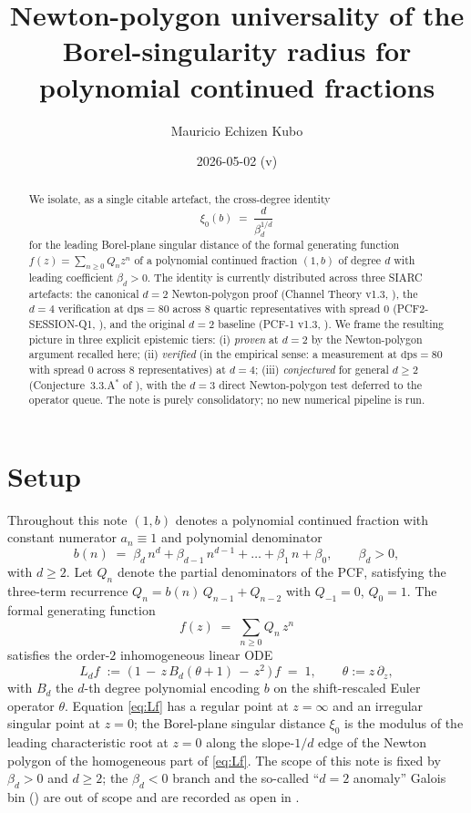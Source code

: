 \documentclass[11pt,reqno]{amsart}
\title[Newton-polygon universality of the Borel-singularity radius]
      {Newton-polygon universality of the Borel-singularity radius
       for polynomial continued fractions}
\author{Mauricio Echizen Kubo}
\date{2026-05-02 (v\version)}
\theoremstyle{plain}
\theoremstyle{definition}
\theoremstyle{remark}
\newcommand{\dps}{\mathrm{dps}}
\begin{document}
\begin{abstract}
We isolate, as a single citable artefact, the cross-degree
identity
\[
  \xi_0(b) \;=\; \frac{d}{\beta_d^{1/d}}
\]
for the leading Borel-plane singular distance of the formal
generating function $f(z) = \sum_{n\ge 0} Q_n z^n$ of a
polynomial continued fraction $(1, b)$ of degree $d$ with
leading coefficient $\beta_d > 0$. The identity is currently
distributed across three SIARC artefacts: the canonical
$d = 2$ Newton-polygon proof (Channel Theory v1.3,
\cite{siarc_channel_theory_v13}), the $d = 4$
verification at $\dps = 80$ across $8$ quartic
representatives with spread $0$
(PCF2-SESSION-Q1, \cite{siarc_pcf2_session_q1}),
and the original $d = 2$ baseline (PCF-1 v1.3,
\cite{siarc_pcf1_v13}). We frame the resulting picture
in three explicit epistemic tiers:
(i) \emph{proven} at $d = 2$ by the Newton-polygon argument
recalled here;
(ii) \emph{verified} (in the empirical sense: a measurement
at $\dps = 80$ with spread $0$ across $8$ representatives) at
$d = 4$;
(iii) \emph{conjectured} for general $d \ge 2$
(Conjecture~3.3.A$^{*}$ of \cite{siarc_channel_theory_v13}),
with the $d = 3$ direct Newton-polygon test deferred to the
operator queue. The note is purely consolidatory; no new
numerical pipeline is run.
\end{abstract}

\maketitle

\section{Setup}
\label{sec:setup}

Throughout this note $(1, b)$ denotes a polynomial continued
fraction with constant numerator $a_n \equiv 1$ and
polynomial denominator
\[
  b(n) \;=\; \beta_d\,n^d + \beta_{d-1}\,n^{d-1} + \dots
              + \beta_1\,n + \beta_0,
  \qquad \beta_d > 0,
\]
with $d \ge 2$. Let $Q_n$ denote the partial denominators
of the PCF, satisfying the three-term recurrence
$Q_n = b(n)\,Q_{n-1} + Q_{n-2}$ with $Q_{-1} = 0$,
$Q_0 = 1$. The formal generating function
\[
  f(z) \;=\; \sum_{n\ge 0} Q_n\,z^n
\]
satisfies the order-$2$ inhomogeneous linear ODE
\begin{equation}
\label{eq:Lf}
  L_d f \;:=\;
   \bigl(\,1 \,-\, z\,B_d(\theta + 1)
            \,-\, z^2\,\bigr)\,f \;=\; 1,
  \qquad \theta := z\,\partial_z,
\end{equation}
with $B_d$ the $d$-th degree polynomial encoding $b$ on the
shift-rescaled Euler operator $\theta$. Equation
\eqref{eq:Lf} has a regular point at $z = \infty$ and an
irregular singular point at $z = 0$; the Borel-plane
singular distance $\xi_0$ is the modulus of the leading
characteristic root at $z = 0$ along the slope-$1/d$ edge
of the Newton polygon of the homogeneous part of
\eqref{eq:Lf}. The scope of this note is fixed by
$\beta_d > 0$ and $d \ge 2$; the $\beta_d < 0$ branch and
the so-called ``$d = 2$ anomaly'' Galois bin
(\cite[Remark~5.E]{siarc_pcf1_v13}) are out of scope and
are recorded as open in .
\end{document}
